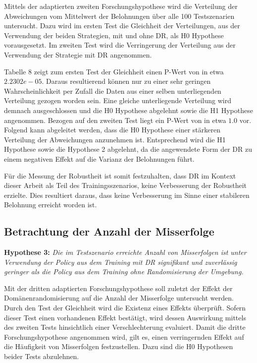 Mittels der adaptierten zweiten Forschungshypothese wird die Verteilung der Abweichungen vom Mittelwert der Belohnungen über alle 100 Testszenarien untersucht. %
Dazu wird im ersten Test die Gleichheit der Verteilungen, aus der Verwendung der beiden Strategien, mit und ohne DR, als H0 Hypothese vorausgesetzt.
Im zweiten Test wird die Verringerung der Verteilung aus der Verwendung der Strategie mit DR angenommen. %

Tabelle 8 zeigt zum ersten Test der Gleichheit einen P-Wert von in etwa $2.2302e-05$.
Daraus resultierend können nur zu einer sehr geringen Wahrscheinlichkeit per Zufall die Daten aus einer selben unterliegenden Verteilung gezogen worden sein. %
Eine gleiche unterliegende Verteilung wird demnach ausgeschlossen und die H0 Hypothese abgelehnt sowie die H1 Hypothese angenommen.
Bezogen auf den zweiten Test liegt ein P-Wert von in etwa $1.0$ vor.
Folgend kann abgeleitet werden, dass die H0 Hypothese einer stärkeren Verteilung der Abweichungen anzunehmen ist. %
Entsprechend wird die H1 Hypothese sowie die Hypothese 2 abgelehnt, da die angewendete Form der DR zu einem negativen Effekt auf die Varianz der Belohnungen führt. %

Für die Messung der Robustheit ist somit festzuhalten, dass DR im Kontext dieser Arbeit als Teil des Trainingsszenarios, keine Verbesserung der Robustheit erzielte.
Dies resultiert daraus, dass keine Verbesserung im Sinne einer stabileren Belohnung erreicht worden ist.

\subsection{Betrachtung der Anzahl der Misserfolge}

\textbf{Hypothese 3:}
\textit{Die im Testszenario erreichte Anzahl von Misserfolgen ist unter Verwendung der Policy aus dem Training mit DR signifikant und zuverlässig geringer als die Policy aus dem Training ohne Randomisierung der Umgebung.}

Mit der dritten adaptierten Forschungshypothese soll zuletzt der Effekt der Domänenrandomisierung auf die Anzahl der Misserfolge untersucht werden.
Durch den Test der Gleichheit wird die Existenz eines Effekts überprüft.
Sofern dieser Test einen vorhandenen Effekt bestätigt, wird dessen Auswirkung mittels des zweiten Tests hinsichtlich einer Verschlechterung evaluiert.
Damit die dritte Forschungshypothese angenommen wird, gilt es, einen verringernden Effekt auf die Häufigkeit von Misserfolgen festzustellen.
Dazu sind die H0 Hypothesen beider Tests abzulehnen.

